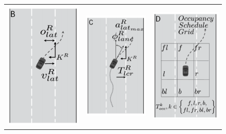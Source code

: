 \begin{figure}[ht!]
\begin{center}
\begin{tabular}{ccc}
\includegraphics[scale=0.5]{./figures/DaimlerLEHipothesis} &

\includegraphics[scale=0.5]{./figures/DaimlerTRAJHipothesis} &

\includegraphics[scale=0.5]{./figures/DaimlerOCCGRIDHipothesis} \\


\end{tabular}
\end{center}
\end{figure}
